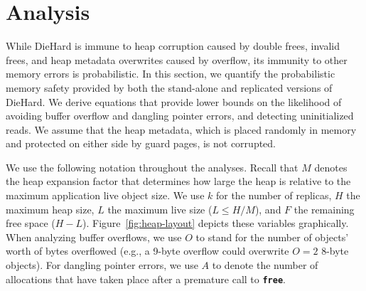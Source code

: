 \documentclass{sig-alternate}
\newcommand{\cfunction}[1]{{\bf \tt #1}}
\newcommand{\free}{\cfunction{free}}
\begin{document}

\section{Analysis}
\label{sec:analysis}



\noindent
While DieHard is immune to heap corruption caused by double frees,
invalid frees, and heap metadata overwrites caused by overflow, its
immunity to other memory errors is probabilistic. In this section, we
quantify the probabilistic memory safety provided by both the
stand-alone and replicated versions of DieHard. We derive equations
that provide lower bounds on the likelihood of avoiding buffer
overflow and dangling pointer errors, and detecting uninitialized
reads. We assume that the heap metadata, which is placed randomly in
memory and protected on either side by guard pages, is not corrupted.

We use the following notation throughout the analyses. Recall that $M$
denotes the heap expansion factor that determines how large the heap is relative to the maximum application live object size. We use $k$ for the number of
replicas, $H$ the maximum heap size, $L$ the maximum live size ($L
\leq H/M$), and $F$ the remaining free space ($H -
L$). Figure~\ref{fig:heap-layout} depicts these variables
graphically. When analyzing buffer overflows, we use $O$ to stand for
the number of objects' worth of bytes overflowed (e.g., a 9-byte
overflow could overwrite $O = 2$ 8-byte objects). For dangling pointer
errors, we use $A$ to denote the number of allocations that have taken
place after a premature call to \free{}.
\end{document}

